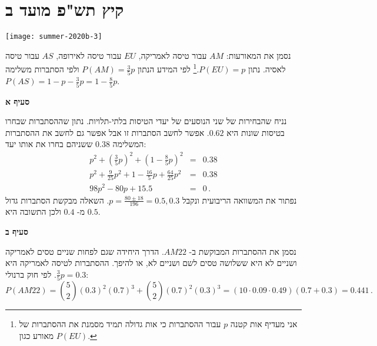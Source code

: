 

\section{קיץ תש"פ מועד ב}

\begin{center}
\texttt{[image: summer-2020b-3]}
\end{center}

נסמן את המאורעות:
$AM$ 
עבור טיסה לאמריקה,
$EU$
עבור טיסה לאירופה,
$AS$
עבור טיסה לאסיה. נתון
$P(EU)=p$.\footnote{%
אני מעדיף אות קטנה 
$p$
עבור ההסתברות כי אות גדולה תמיד מסמנת את ההסתברות של מאורע כגון
$P(EU)$.}
לפי המידע הנתון
$P(AM)=\frac{3}{5}p$
ולפי הסתברות משלימה
$P(AS)=1-p-\frac{3}{5}p=1-\frac{8}{5}p$.

\textbf{סעיף א}

נניח שהבחירות של שני הנוסעים של יעדי הטיסות בלתי-תלויות. נתון שההסתברות שבחרו בטיסות שונות היא 
$0.62$.
אפשר לחשב הסתברות זו אבל אפשר גם לחשב את ההסתברות המשלימה
$0.38$
ששניהם בחרו את אותו יעד:
\begin{eqnarray*}
p^2 + \left(\frac{3}{5}p\right)^2+\left(1-\frac{8}{5}p\right)^2&=&0.38\\
p^2 + \frac{9}{25}p^2+1-\frac{16}{5}p+\frac{64}{25}p^2&=&0.38\\
98p^2 -80p+15.5 &=&0\,.
\end{eqnarray*}
נפתור את המשוואה הריבועית ונקבל
$p=\frac{80\pm 18}{196}= 0.5, 0.3$.
השאלה מבקשת הסתברות גדול מ-%
$0.4$
ולכן התשובה היא
$0.5$.

\textbf{סעיף ב}

נסמן את ההסתברות המבוקשת ב-%
$AM22$.
הדרך היחידה שגם לפחות שניים טסים לאמריקה ושניים לא היא ששלושה טסים לשם ושניים לא, או להיפך. ההסתברות לטיסה לאמריקה היא
$\frac{3}{5}p=0.3$.
לפי חוק ברנולי:
\[
P(AM22)={5 \choose 2}(0.3)^2(0.7)^3 +{5 \choose 2}(0.7)^2(0.3)^3=
(10\cdot 0.09 \cdot 0.49) (0.7+0.3)=0.441\,.
\]

